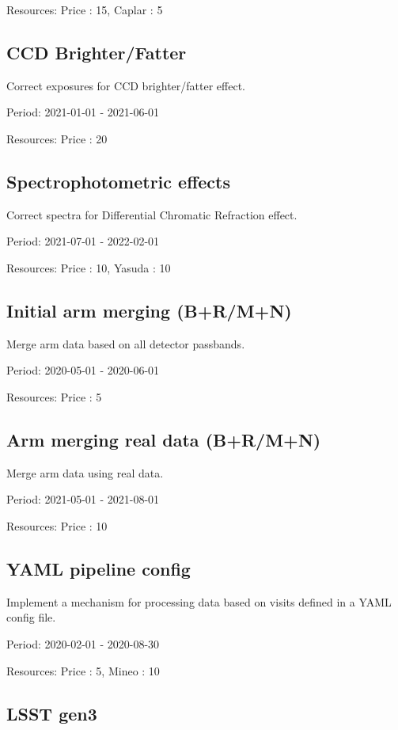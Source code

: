 Resources: Price : 15, Caplar : 5

\subsection{CCD Brighter/Fatter}

Correct exposures for CCD brighter/fatter effect.

Period: 2021-01-01 - 2021-06-01

Resources: Price : 20

\subsection{Spectrophotometric effects}

Correct spectra for Differential Chromatic Refraction effect.

Period: 2021-07-01 - 2022-02-01

Resources: Price : 10, Yasuda : 10

\subsection{Initial arm merging (B+R/M+N)}

Merge arm data based on all detector passbands.

Period: 2020-05-01 - 2020-06-01

Resources: Price : 5

\subsection{Arm merging real data (B+R/M+N)}

Merge arm data using real data.

Period: 2021-05-01 - 2021-08-01

Resources: Price : 10

\subsection{YAML pipeline config}

Implement a mechanism for processing data based on visits defined in a YAML config file.

Period: 2020-02-01 - 2020-08-30

Resources: Price : 5, Mineo : 10

\subsection{LSST gen3}

